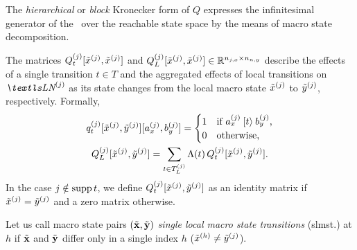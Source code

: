 The \emph{hierarchical} or \emph{block} Kronecker form of $Q$
expresses the infinitesimal generator of the \CTMC\ over the reachable
state space by the means of macro state decomposition.

The matrices $Q_t^{(j)}[\tilde{x}^{(j)}, \tilde{x}^{(j)}]$
and $Q_L^{(j)}[\tilde{x}^{(j)}, \tilde{x}^{(j)}] \in
\mathbb{R}^{n_{j,x} \times n_{n, y}}$ describe
the effects of a single transition $t \in T$ and the aggregated effects of
local transitions on $\LN{j}$ as its state changes from the local
macro state $\tilde{x}^{(j)}$ to $\tilde{y}^{(j)}$,
respectively. Formally,
\begin{gather}
  q_t^{(j)}[\tilde{x}^{(j)},
  \tilde{y}^{(j)}][a_x^{(j)}, b_y^{(j)}] = \begin{cases}
    1 & \text{if $a_x^{(j)} \mathbin{[t\rangle} b_y^{(j)}$,} \\
    0 & \text{otherwise,}
  \end{cases} \label{eq:genstor:explicit:block:tran-matrix}\\
  Q_L^{(j)}[\tilde{x}^{(j)}, \tilde{y}^{(j)}] = \sum_{t \in
    T_L^{(j)}} \Lambda(t) \, Q_t^{(j)}[\tilde{x}^{(j)},
  \tilde{y}^{(j)}] \label{eq:genstor:explicit:block:local-matrix} \text.
\end{gather}
In the case $j \notin \operatorname{supp} t$, we define $Q_t^{(j)}[\tilde{x}^{(j)},
\tilde{y}^{(j)}]$ as an identity matrix if $\tilde{x}^{(j)} =
\tilde{y}^{(j)}$ and a zero matrix otherwise.

Let us call macro state pairs $(\tilde{\bm{\mathrm{x}}}, \tilde{\bm{\mathrm{y}}})$
\emph{single local macro state transitions} (slmst.) at $h$ if $\tilde{\bm{\mathrm{x}}}$
and $\tilde{\bm{\mathrm{y}}}$ differ only in a single index $h$
($\tilde{x}^{(h)} \ne \tilde{y}^{(j)}$).

